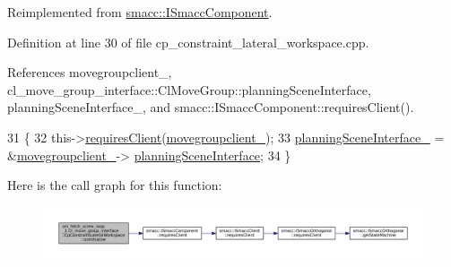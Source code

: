 Reimplemented from \hyperlink{classsmacc_1_1ISmaccComponent_ae6f71d008db12553912e9436184b9e65}{smacc\+::\+I\+Smacc\+Component}.



Definition at line 30 of file cp\+\_\+constraint\+\_\+lateral\+\_\+workspace.\+cpp.



References movegroupclient\+\_\+, cl\+\_\+move\+\_\+group\+\_\+interface\+::\+Cl\+Move\+Group\+::planning\+Scene\+Interface, planning\+Scene\+Interface\+\_\+, and smacc\+::\+I\+Smacc\+Component\+::requires\+Client().


\begin{DoxyCode}
31         \{
32             this->\hyperlink{classsmacc_1_1ISmaccComponent_a36c085d906fbae0fcaee817aaeafebf4}{requiresClient}(\hyperlink{classsm__fetch__screw__loop__1_1_1cl__move__group__interface_1_1CpConstraintLateralWorkspace_ab15ede0c513feae2efd7241418854381}{movegroupclient\_});
33             \hyperlink{classsm__fetch__screw__loop__1_1_1cl__move__group__interface_1_1CpConstraintLateralWorkspace_abf0b9ad04e9a615b215cc8841888696e}{planningSceneInterface\_} = &\hyperlink{classsm__fetch__screw__loop__1_1_1cl__move__group__interface_1_1CpConstraintLateralWorkspace_ab15ede0c513feae2efd7241418854381}{movegroupclient\_}->
      \hyperlink{classcl__move__group__interface_1_1ClMoveGroup_a11bfab580f36e2ad32c9b37d6f58f44c}{planningSceneInterface};
34         \}
\end{DoxyCode}
Here is the call graph for this function\+:
\nopagebreak
\begin{figure}[H]
\begin{center}
\leavevmode
\includegraphics[width=350pt]{classsm__fetch__screw__loop__1_1_1cl__move__group__interface_1_1CpConstraintLateralWorkspace_a6b1911a83059bef46803e9973fc325d8_cgraph}
\end{center}
\end{figure}
\mbox{\label{classsm__fetch__screw__loop__1_1_1cl__move__group__interface_1_1CpConstraintLateralWorkspace_a42a932b985fa0e4f9f48e52b363bf6c2}} 
